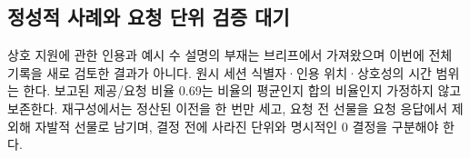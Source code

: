 \subsection{정성적 사례와 요청 단위 검증 대기}\label{app:cases}
상호 지원에 관한 인용과 예시 수 설명의 부재는 브리프에서 가져왔으며 이번에 전체 기록을 새로 검토한 결과가 아니다. 원시 세션 식별자·인용 위치·상호성의 시간 범위는 한다. 보고된 제공/요청 비율 0.69는 비율의 평균인지 합의 비율인지 가정하지 않고 보존한다. 재구성에서는 정산된 이전을 한 번만 세고, 요청 전 선물을 요청 응답에서 제외해 자발적 선물로 남기며, 결정 전에 사라진 단위와 명시적인 0 결정을 구분해야 한다.



